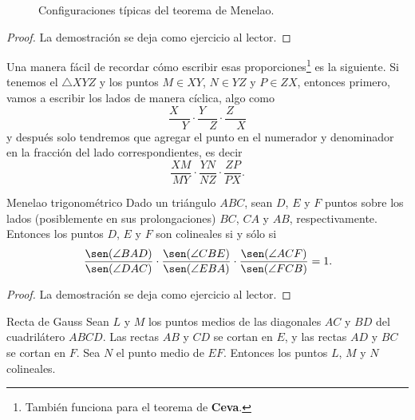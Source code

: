 \begin{figure}[H]
    \centering
    
    \caption{Configuraciones típicas del teorema de Menelao.}
\end{figure}

\begin{proof}
    La demostración se deja como ejercicio al lector.
\end{proof}


\begin{remark.tcb}
    Una manera fácil de recordar cómo escribir esas proporciones\footnote{También funciona para el teorema de \textbf{Ceva}.} es la siguiente.
    Si tenemos el $\triangle XYZ$ y los puntos $M \in XY$, $N \in YZ$ y $P \in ZX$, entonces primero, vamos a escribir los lados de manera cíclica, algo como
    \[
        \frac{X\quad}{\quad Y} \cdot \frac{Y\quad}{\quad Z} \cdot \frac{Z\quad}{\quad X}
    \]
    y después solo tendremos que agregar el punto en el numerador y denominador en la fracción del lado correspondientes, es decir
    \[
        \frac{XM}{MY} \cdot \frac{YN}{NZ} \cdot \frac{ZP}{PX}.
    \]
\end{remark.tcb}


\begin{section-theorem.tcb}{Menelao trigonométrico}{}
    Dado un triángulo $ABC$, sean $D$, $E$ y $F$ puntos sobre los lados (posiblemente en sus prolongaciones) $BC$, $CA$ y $AB$, respectivamente.
    Entonces los puntos $D$, $E$ y $F$ son colineales si y sólo si
    \[
        \frac{\sen(\angle BAD)}{\sen(\angle DAC)} \cdot \frac{\sen(\angle CBE)}{\sen(\angle EBA)} \cdot \frac{\sen(\angle ACF)}{\sen(\angle FCB)} = 1.
    \]
\end{section-theorem.tcb}

\begin{proof}
    La demostración se deja como ejercicio al lector.
\end{proof}

\begin{section-theorem.tcb}{Recta de Gauss}{}
    Sean $L$ y $M$ los puntos medios de las diagonales $AC$ y $BD$ del cuadrilátero $ABCD$.
    Las rectas $AB$ y $CD$ se cortan en $E$, y las rectas $AD$ y $BC$ se cortan en $F$.
    Sea $N$ el punto medio de $EF$.
    Entonces los puntos $L$, $M$ y $N$ colineales.
\end{section-theorem.tcb}

